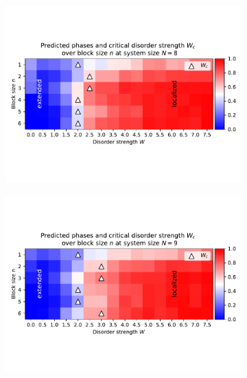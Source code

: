 \documentclass[reprint,amsmath,amssymb,aps,prb]{revtex4-2}
\begin{document}
\begin{center}
	\begin{figure}[hb!]
		\centering	
		\begin{subfigure}[c]{0.4\textwidth}
			\includegraphics[width=\textwidth, trim={0 2cm 0 3cm},clip]{../results/Wc/N8_Wc_n_dependency.pdf}
		\end{subfigure}
		\begin{subfigure}[c]{0.4\textwidth}
			\includegraphics[width=\textwidth, trim={0 2cm 0 3cm},clip]{../results/Wc/N9_Wc_n_dependency.pdf}
		\end{subfigure}
	\end{figure}
	\begin{figure}[ht!]\ContinuedFloat

\end{figure}
\end{center}
\end{document}

